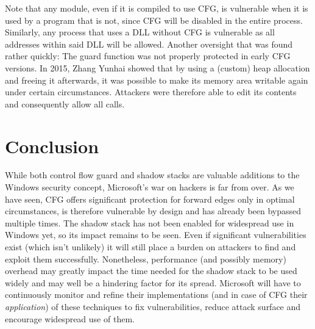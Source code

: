 \documentclass[10pt,twocolumn,a4paper]{article}
\begin{document}
Note that any module, even if it is compiled to use CFG, is vulnerable when it is used by a program that is not, since CFG will be disabled in the entire process\cite{cfgexplore}.
Similarly, any process that uses a DLL without CFG is vulnerable as all addresses within said DLL will be allowed\cite{cfgbypass2}.
Another oversight that was found rather quickly: The guard function was not properly protected in early CFG versions.
In 2015, Zhang Yunhai showed that by using a (custom) heap allocation and freeing it afterwards,  it was possible to make its memory area writable again under certain circumstances\cite{cfgbypass}.
Attackers were therefore able to edit its contents and consequently allow all calls.


\section{Conclusion}\label{sec:conclusion}

While both control flow guard and shadow stacks are valuable additions to the Windows security concept, Microsoft's war on hackers is far from over. As we have seen, CFG offers significant protection for forward edges only in optimal circumstances, is therefore vulnerable by design and has already been bypassed multiple times. The shadow stack has not been enabled for widespread use in Windows yet, so its impact remains to be seen. Even if significant vulnerabilities exist (which isn't unlikely) it will still place a burden on attackers to find and exploit them successfully.
Nonetheless, performance (and possibly memory) overhead may greatly impact the time needed for the shadow stack to be used widely and may well be a hindering factor for its spread.
Microsoft will have to continuously monitor and refine their implementations (and in case of CFG their \emph{application}) of these techniques to fix vulnerabilities, reduce attack surface and encourage widespread use of them.




\end{document}
